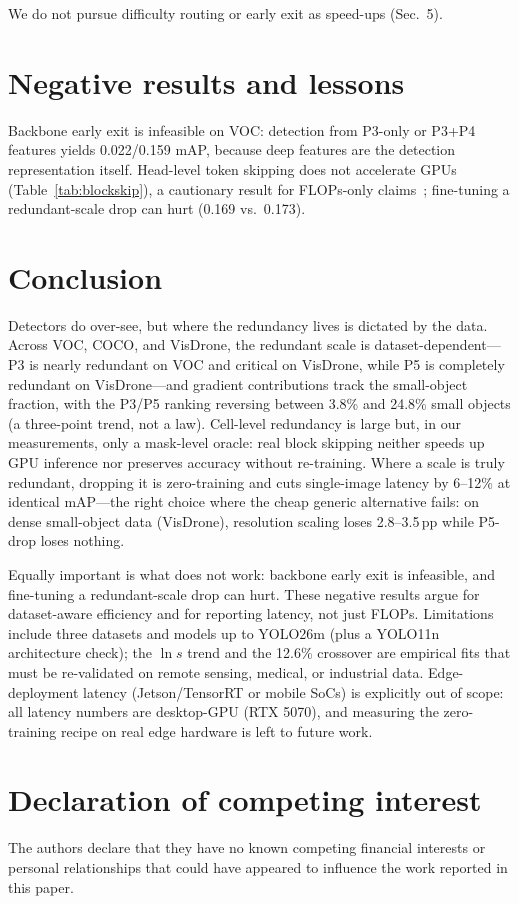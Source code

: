 \documentclass[a4paper,fleqn]{cas-dc}
\begin{document}
We do not pursue difficulty routing or early exit as speed-ups (Sec.~5).

\section{Negative results and lessons}
Backbone early exit is infeasible on VOC: detection from P3-only or P3+P4 features yields 0.022/0.159 mAP, because deep features are the detection representation itself. Head-level token skipping does not accelerate GPUs (Table~\ref{tab:blockskip}), a cautionary result for FLOPs-only claims~\cite{rao2021dynamicvit,liang2022evit}; fine-tuning a redundant-scale drop can hurt (0.169 vs.\ 0.173).

\section{Conclusion}
Detectors do over-see, but where the redundancy lives is dictated by the data. Across VOC, COCO, and VisDrone, the redundant scale is dataset-dependent---P3 is nearly redundant on VOC and critical on VisDrone, while P5 is completely redundant on VisDrone---and gradient contributions track the small-object fraction, with the P3/P5 ranking reversing between 3.8\% and 24.8\% small objects (a three-point trend, not a law). Cell-level redundancy is large but, in our measurements, only a mask-level oracle: real block skipping neither speeds up GPU inference nor preserves accuracy without re-training. Where a scale is truly redundant, dropping it is zero-training and cuts single-image latency by 6--12\% at identical mAP---the right choice where the cheap generic alternative fails: on dense small-object data (VisDrone), resolution scaling loses 2.8--3.5\,pp while P5-drop loses nothing.

Equally important is what does not work: backbone early exit is infeasible, and fine-tuning a redundant-scale drop can hurt. These negative results argue for dataset-aware efficiency and for reporting latency, not just FLOPs. Limitations include three datasets and models up to YOLO26m (plus a YOLO11n architecture check); the $\ln s$ trend and the 12.6\% crossover are empirical fits that must be re-validated on remote sensing, medical, or industrial data. Edge-deployment latency (Jetson/TensorRT or mobile SoCs) is explicitly out of scope: all latency numbers are desktop-GPU (RTX 5070), and measuring the zero-training recipe on real edge hardware is left to future work.

\section*{Declaration of competing interest}
The authors declare that they have no known competing financial interests or personal relationships that could have appeared to influence the work reported in this paper.
\end{document}

